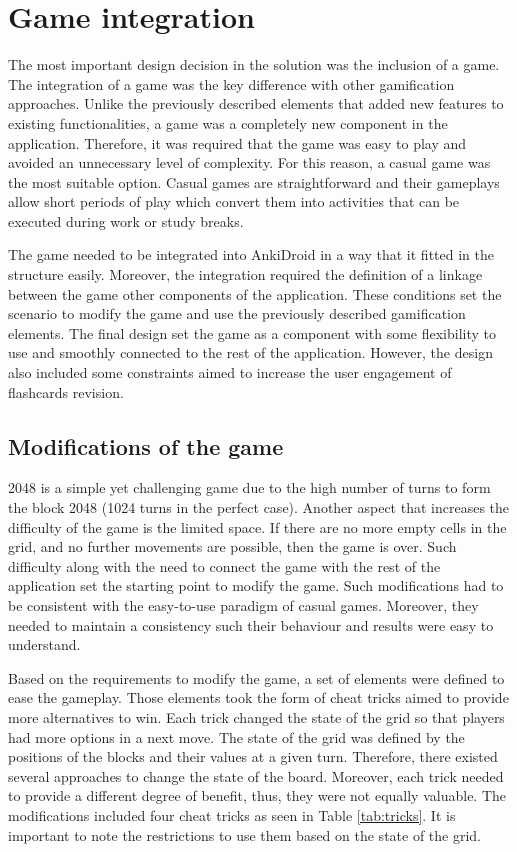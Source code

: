 \section{Game integration}
\label{game-integration}
The most important design decision in the solution was the inclusion of a game. The integration of a game was the key difference with other gamification approaches. Unlike the previously described elements that added new features to existing functionalities, a game was a completely new component in the application. Therefore, it was required that the game was easy to play and avoided an unnecessary level of complexity. For this reason, a casual game was the most suitable option. Casual games are straightforward and their gameplays allow short periods of play which convert them into activities that can be executed during work or study breaks.

The game needed to be integrated into AnkiDroid in a way that it fitted in the structure easily. Moreover, the integration required the definition of a linkage between the game other components of the application. These conditions set the scenario to modify the game and use the previously described gamification elements. The final design set the game as a component with some flexibility to use and smoothly connected to the rest of the application. However, the design also included some constraints aimed to increase the user engagement of flashcards revision.

\subsection{Modifications of the game}
2048 is a simple yet challenging game due to the high number of turns to form the block 2048 (1024 turns in the perfect case). Another aspect that increases the difficulty of the game is the limited space. If there are no more empty cells in the grid, and no further movements are possible, then the game is over. Such difficulty along with the need to connect the game with the rest of the application set the starting point to modify the game. Such modifications had to be consistent with the easy-to-use paradigm of casual games. Moreover, they needed to maintain a consistency such their behaviour and results were easy to understand.

Based on the requirements to modify the game, a set of elements were defined to ease the gameplay. Those elements took the form of cheat tricks aimed to provide more alternatives to win. Each trick changed the state of the grid so that players had more options in a next move. The state of the grid was defined by the positions of the blocks and their values at a given turn. Therefore, there existed several approaches to change the state of the board. Moreover, each trick needed to provide a different degree of benefit, thus, they were not equally valuable. The modifications included four cheat tricks as seen in Table \ref{tab:tricks}. It is important to note the restrictions to use them based on the state of the grid.

